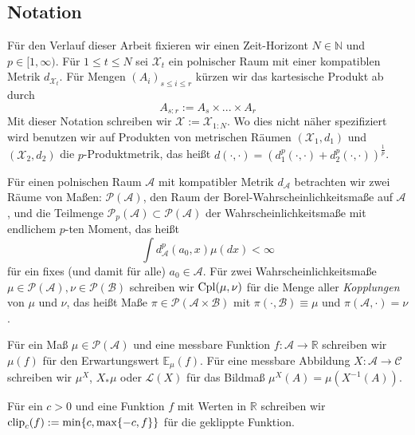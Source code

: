 \subsection{Notation}
Für den Verlauf dieser Arbeit fixieren wir einen Zeit-Horizont $N \in \mathbb{N}$ und $p \in [1,\infty)$. Für $1\leq t \leq N$ sei $\mathcal{X}_t$ ein polnischer Raum mit einer kompatiblen Metrik $d_{\mathcal{X}_t}$. Für Mengen $\left(A_{i}\right)_{s\leq i \leq r}$ kürzen wir das kartesische Produkt ab durch
$$A_{s:r} := A_s \times ... \times A_r$$
Mit dieser Notation schreiben wir $\mathcal{X}:=\mathcal{X}_{1:N}$. Wo dies nicht näher spezifiziert wird benutzen wir auf Produkten von metrischen Räumen $(\mathcal{X}_1, d_1)$ und $(\mathcal{X}_2, d_2)$ die $p$-Produktmetrik, das heißt $d(\cdot, \cdot) = \left(d_1^p(\cdot, \cdot) + d_2^p(\cdot, \cdot) \right)^\frac{1}{p}$.

Für einen polnischen Raum $\mathcal{A}$ mit kompatibler Metrik $d_\mathcal{A}$ betrachten wir zwei Räume von Maßen: $\mathcal{P}(\mathcal{A})$, den Raum der Borel-Wahrscheinlichkeitsmaße auf $\mathcal{A}$, und die Teilmenge $\mathcal{P}_p(\mathcal{A}) \subset \mathcal{P}(\mathcal{A})$ der Wahrscheinlichkeitsmaße mit endlichem $p$-ten Moment, das heißt
$$\int d_\mathcal{A}^p(a_0, x) \mu(dx) < \infty$$
für ein fixes (und damit für alle) $a_0 \in \mathcal{A}$. Für zwei Wahrscheinlichkeitsmaße $\mu \in \mathcal{P}(\mathcal{A}), \nu \in \mathcal{P}(\mathcal{B})$ schreiben wir $\operatorname{Cpl}(\mu, \nu)$ für die Menge aller \emph{Kopplungen} von $\mu$ und $\nu$, das heißt Maße $\pi \in \mathcal{P}(\mathcal{A} \times \mathcal{B})$ mit $\pi(\cdot, \mathcal{B})\equiv \mu$ und $\pi(\mathcal{A}, \cdot)=\nu$. 

Für ein Maß $\mu \in \mathcal{P}(\mathcal{A})$ und eine messbare Funktion $f: \mathcal{A} \rightarrow \mathbb{R}$ schreiben wir $\mu(f)$ für den Erwartungswert $\mathbb{E}_\mu(f)$. Für eine messbare Abbildung $X: \mathcal{A} \rightarrow \mathcal{C}$ schreiben wir $\mu^X$, $X_*\mu$ oder $\mathcal{L}(X)$ für das Bildmaß $\mu^X(A) = \mu(X^{-1}(A))$. 

Für ein $c>0$ und eine Funktion $f$ mit Werten in $\mathbb{R}$ schreiben wir $\operatorname{clip}_c(f):= \min\{c, \max\{-c, f\}\}$ für die geklippte Funktion.

